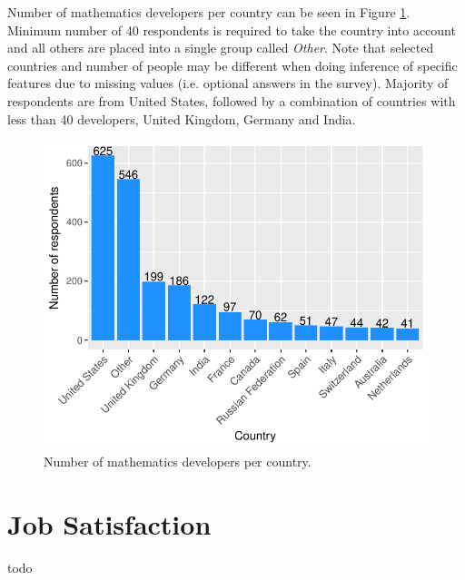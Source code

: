 \documentclass[9pt]{article}
\begin{document}
\vspace{2mm}

Number of mathematics developers per country can be seen in Figure \ref{fig_0}. Minimum number of 40 respondents is required to take the country into account and all others are placed into a single group called \textit{Other}. Note that selected countries and number of people may be different when doing inference of specific features due to missing values (i.e. optional answers in the survey). Majority of respondents are from United States, followed by a combination of countries with less than 40 developers, United Kingdom, Germany and India.


\begin{figure}[H]
\centering
\includegraphics{report-005}
\caption{Number of mathematics developers per country.}\label{fig_0}
\end{figure}

\section{Job Satisfaction}
todo
\end{document}
